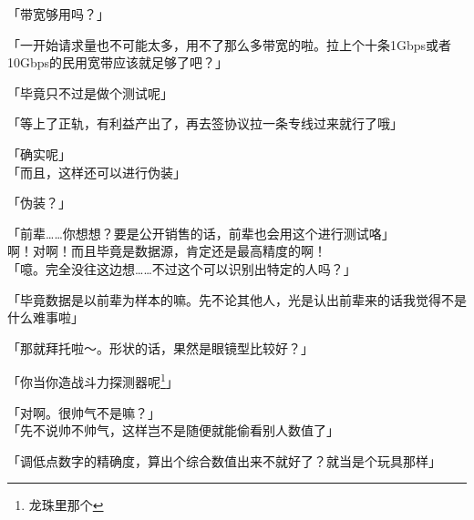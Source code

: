 「带宽够用吗？」

「一开始请求量也不可能太多，用不了那么多带宽的啦。拉上个十条1Gbps或者10Gbps的民用宽带应该就足够了吧？」

「毕竟只不过是做个测试呢」

「等上了正轨，有利益产出了，再去签协议拉一条专线过来就行了哦」

「确实呢」\\

「而且，这样还可以进行伪装」

「伪装？」

「前辈……你想想？要是公开销售的话，前辈也会用这个进行测试咯」\\

啊！对啊！而且毕竟是数据源，肯定还是最高精度的啊！\\

「噫。完全没往这边想……不过这个可以识别出特定的人吗？」

「毕竟数据是以前辈为样本的嘛。先不论其他人，光是认出前辈来的话我觉得不是什么难事啦」

「那就拜托啦～。形状的话，果然是眼镜型比较好？」

「你当你造战斗力探测器呢\footnote{龙珠里那个}」

「对啊。很帅气不是嘛？」\\

「先不说帅不帅气，这样岂不是随便就能偷看别人数值了」

「调低点数字的精确度，算出个综合数值出来不就好了？就当是个玩具那样」

